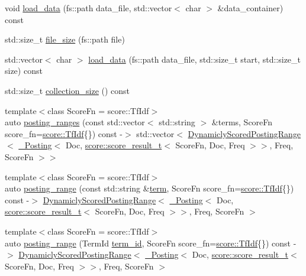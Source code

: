 \begin{DoxyCompactItemize}
void \mbox{\hyperlink{classirkit_1_1Index_acdc1ba811044619795c2ab7eeed13abc}{load\+\_\+data}} (fs\+::path data\+\_\+file, std\+::vector$<$ char $>$ \&data\+\_\+container) const
\item 
std\+::size\+\_\+t \mbox{\hyperlink{classirkit_1_1Index_a47d88bb03c2c547fc159739b13871f68}{file\+\_\+size}} (fs\+::path file)
\item 
std\+::vector$<$ char $>$ \mbox{\hyperlink{classirkit_1_1Index_a2dfd40f97f0022b075c8aaa38d96edc7}{load\+\_\+data}} (fs\+::path data\+\_\+file, std\+::size\+\_\+t start, std\+::size\+\_\+t size) const
\item 
std\+::size\+\_\+t \mbox{\hyperlink{classirkit_1_1Index_a45ede4e9e43c8a813d13467d97c084a1}{collection\+\_\+size}} () const
\item 
{\footnotesize template$<$class Score\+Fn  = score\+::\+Tf\+Idf$>$ }\\auto \mbox{\hyperlink{classirkit_1_1Index_ada30daf417b2dc957840170d90dba798}{posting\+\_\+ranges}} (const std\+::vector$<$ std\+::string $>$ \&terms, Score\+Fn score\+\_\+fn=\mbox{\hyperlink{structirkit_1_1score_1_1TfIdf}{score\+::\+Tf\+Idf}}\{\}) const -\/$>$ std\+::vector$<$ \mbox{\hyperlink{classirkit_1_1DynamiclyScoredPostingRange}{Dynamicly\+Scored\+Posting\+Range}}$<$ \mbox{\hyperlink{structirkit_1_1__Posting}{\+\_\+\+Posting}}$<$ Doc, \mbox{\hyperlink{namespaceirkit_1_1score_ab6226695d6d5c54c84fcf2cb8e90c8b3}{score\+::score\+\_\+result\+\_\+t}}$<$ Score\+Fn, Doc, Freq $>$$>$, Freq, Score\+Fn $>$$>$
\item 
{\footnotesize template$<$class Score\+Fn  = score\+::\+Tf\+Idf$>$ }\\auto \mbox{\hyperlink{classirkit_1_1Index_a931de856b06aac7957f7182048e8e852}{posting\+\_\+range}} (const std\+::string \&\mbox{\hyperlink{classirkit_1_1Index_a62050b0a8c8556262b82a45be1ae0262}{term}}, Score\+Fn score\+\_\+fn=\mbox{\hyperlink{structirkit_1_1score_1_1TfIdf}{score\+::\+Tf\+Idf}}\{\}) const -\/$>$ \mbox{\hyperlink{classirkit_1_1DynamiclyScoredPostingRange}{Dynamicly\+Scored\+Posting\+Range}}$<$ \mbox{\hyperlink{structirkit_1_1__Posting}{\+\_\+\+Posting}}$<$ Doc, \mbox{\hyperlink{namespaceirkit_1_1score_ab6226695d6d5c54c84fcf2cb8e90c8b3}{score\+::score\+\_\+result\+\_\+t}}$<$ Score\+Fn, Doc, Freq $>$$>$, Freq, Score\+Fn $>$
\item 
{\footnotesize template$<$class Score\+Fn  = score\+::\+Tf\+Idf$>$ }\\auto \mbox{\hyperlink{classirkit_1_1Index_abeb1c1b2ddc660e42c5c6dad0bab4dc4}{posting\+\_\+range}} (Term\+Id \mbox{\hyperlink{classirkit_1_1Index_a753cf658f5464ae7f19e8e12831abc65}{term\+\_\+id}}, Score\+Fn score\+\_\+fn=\mbox{\hyperlink{structirkit_1_1score_1_1TfIdf}{score\+::\+Tf\+Idf}}\{\}) const -\/$>$ \mbox{\hyperlink{classirkit_1_1DynamiclyScoredPostingRange}{Dynamicly\+Scored\+Posting\+Range}}$<$ \mbox{\hyperlink{structirkit_1_1__Posting}{\+\_\+\+Posting}}$<$ Doc, \mbox{\hyperlink{namespaceirkit_1_1score_ab6226695d6d5c54c84fcf2cb8e90c8b3}{score\+::score\+\_\+result\+\_\+t}}$<$ Score\+Fn, Doc, Freq $>$$>$, Freq, Score\+Fn $>$

\end{DoxyCompactItemize}
